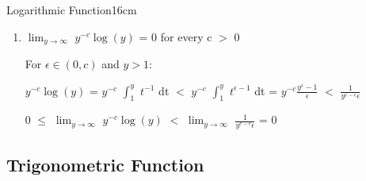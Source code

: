 \begin{definition}{Logarithmic Function}{16cm}
\begin{enumerate}[label=(\alph*), leftmargin=1.5cm, itemsep=0.1cm]
                Thus:

                \hspace{0.5cm}
                If c $\not =$ -1, then $\int$ $y^c$ dy
                = $\int$ $\frac{1}{c+1} (y^{c+1})'$ dy
                = $\frac{1}{c+1}y^{c+1}$

                \hspace{0.5cm}
                If c = -1, then $\int$ $y^{-1}$ dy
                = $\int$ L'(y) dy
                = L(y) = log(y)

            \item $\lim_{y \rightarrow \infty}$ $y^{-c} \log(y)$ = 0
                for every c $>$ 0
            
                For $\epsilon \in (0,c)$ and $y > 1$:

                \hspace{0.5cm}
                $y^{-c} \log(y)$
                = $y^{-c}$ $\int_1^y$ $t^{-1}$ dt
                $<$ $y^{-c}$ $\int_1^y$ $t^{\epsilon - 1}$ dt
                = $y^{-c} \frac{y^{\epsilon} - 1}{\epsilon}$
                $<$ $\frac{1}{y^{c - \epsilon}\epsilon}$

                \hspace{0.5cm}
                0 $\leq$ $\lim_{y \rightarrow \infty}$ $y^{-c} \log(y)$
                $<$ $\lim_{y \rightarrow \infty}$
                $\frac{1}{y^{c - \epsilon}\epsilon}$
                = 0
        \end{enumerate}
    \end{definition}

    \newpage





\subsection{ Trigonometric Function }

